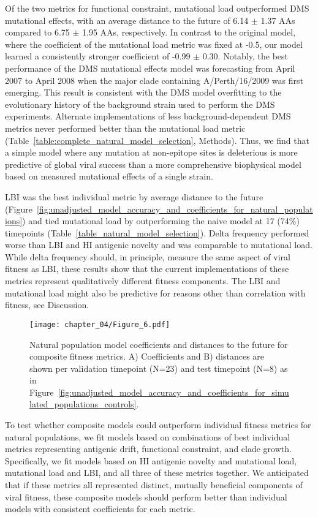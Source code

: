 Of the two metrics for functional constraint, mutational load outperformed DMS mutational effects, with an average distance to the future of 6.14 $\pm$ 1.37 AAs compared to 6.75 $\pm$ 1.95 AAs, respectively.
In contrast to the original \cite{Luksza:2014hj} model, where the coefficient of the mutational load metric was fixed at -0.5, our model learned a consistently stronger coefficient of -0.99 $\pm$ 0.30.
Notably, the best performance of the DMS mutational effects model was forecasting from April 2007 to April 2008 when the major clade containing A/Perth/16/2009 was first emerging.
This result is consistent with the DMS model overfitting to the evolutionary history of the background strain used to perform the DMS experiments.
Alternate implementations of less background-dependent DMS metrics never performed better than the mutational load metric (Table~\ref{table:complete_natural_model_selection}, Methods).
Thus, we find that a simple model where any mutation at non-epitope sites is deleterious is more predictive of global viral success than a more comprehensive biophysical model based on measured mutational effects of a single strain.

LBI was the best individual metric by average distance to the future (Figure~\ref{fig:unadjusted_model_accuracy_and_coefficients_for_natural_populations}) and tied mutational load by outperforming the naive model at 17 (74\%) timepoints (Table~\ref{table_natural_model_selection}).
Delta frequency performed worse than LBI and HI antigenic novelty and was comparable to mutational load.
While delta frequency should, in principle, measure the same aspect of viral fitness as LBI, these results show that the current implementations of these metrics represent qualitatively different fitness components.
The LBI and mutational load might also be predictive for reasons other than correlation with fitness, see Discussion.

\begin{figure}
  \texttt{[image: chapter\_04/Figure\_6.pdf]}
  \caption{
    Natural population model coefficients and distances to the future for composite fitness metrics.
    A) Coefficients and B) distances are shown per validation timepoint (N=23) and test timepoint (N=8) as in Figure~\ref{fig:unadjusted_model_accuracy_and_coefficients_for_simulated_populations_controls}.
  }
  \label{fig:unadjusted_composite_model_accuracy_and_coefficients_for_natural_populations}
\end{figure}

To test whether composite models could outperform individual fitness metrics for natural populations, we fit models based on combinations of best individual metrics representing antigenic drift, functional constraint, and clade growth.
Specifically, we fit models based on HI antigenic novelty and mutational load, mutational load and LBI, and all three of these metrics together.
We anticipated that if these metrics all represented distinct, mutually beneficial components of viral fitness, these composite models should perform better than individual models with consistent coefficients for each metric.

